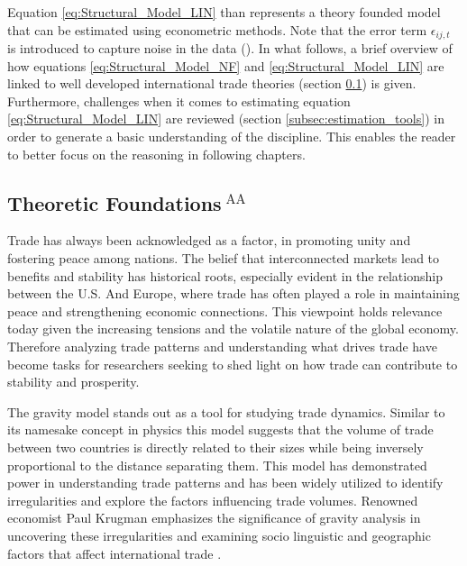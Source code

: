 \begin{equation}
\end{equation} Equation \ref{eq:Structural_Model_LIN} than represents a theory founded model that can be estimated using econometric methods. Note that the error term $\epsilon_{ij,t}$ is introduced to capture noise in the data (\cite[p. 17]{yotov2016advanced}). In what follows, a brief overview of how equations \ref{eq:Structural_Model_NF} and \ref{eq:Structural_Model_LIN} are linked to well developed international trade theories (section \ref{subsec:theoretic_foundations}) is given. Furthermore, challenges when it comes to estimating equation \ref{eq:Structural_Model_LIN} are reviewed (section \ref{subsec:estimation_tools}) in order to generate a basic understanding of the discipline. This enables the reader to better focus on the reasoning in following chapters.











\subsection[Theoretic Foundations]{Theoretic Foundations$^{\text{ AA}}$}
\label{subsec:theoretic_foundations}

Trade has always been acknowledged as a factor, in promoting unity and fostering peace among nations. The belief that interconnected markets lead to benefits and stability has historical roots, especially evident in the relationship between the U.S. And Europe, where trade has often played a role in maintaining peace and strengthening economic connections. This viewpoint holds relevance today given the increasing tensions and the volatile nature of the global economy. Therefore analyzing trade patterns and understanding what drives trade have become tasks for researchers seeking to shed light on how trade can contribute to stability and prosperity.

The gravity model stands out as a tool for studying trade dynamics. Similar to its namesake concept in physics this model suggests that the volume of trade between two countries is directly related to their sizes while being inversely proportional to the distance separating them. This model has demonstrated power in understanding trade patterns and has been widely utilized to identify irregularities and explore the factors influencing trade volumes. Renowned economist Paul Krugman emphasizes the significance of gravity analysis in uncovering these irregularities and examining socio linguistic and geographic factors that affect international trade .

